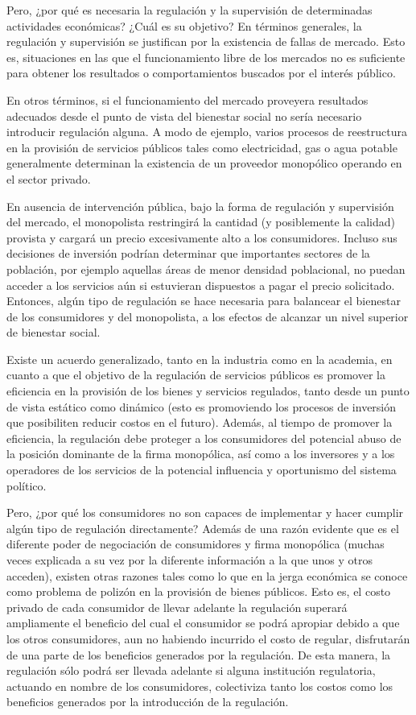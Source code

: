 \documentclass[
  12pt,
  spanish,
]{book}
\begin{document}
Pero, ¿por qué es necesaria la regulación y la supervisión de determinadas actividades económicas? ¿Cuál es su objetivo? En términos generales, la regulación y supervisión se justifican por la existencia de fallas de mercado. Esto es, situaciones en las que el funcionamiento libre de los mercados no es suficiente para obtener los resultados o comportamientos buscados por el interés público.

En otros términos, si el funcionamiento del mercado proveyera resultados adecuados desde el punto de vista del bienestar social no sería necesario introducir regulación alguna. A modo de ejemplo, varios procesos de reestructura en la provisión de servicios públicos tales como electricidad, gas o agua potable generalmente determinan la existencia de un proveedor monopólico operando en el sector privado.

En ausencia de intervención pública, bajo la forma de regulación y supervisión del mercado, el monopolista restringirá la cantidad (y posiblemente la calidad) provista y cargará un precio excesivamente alto a los consumidores. Incluso sus decisiones de inversión podrían determinar que importantes sectores de la población, por ejemplo aquellas áreas de menor densidad poblacional, no puedan acceder a los servicios aún si estuvieran dispuestos a pagar el precio solicitado. Entonces, algún tipo de regulación se hace necesaria para balancear el bienestar de los consumidores y del monopolista, a los efectos de alcanzar un nivel superior de bienestar social.

Existe un acuerdo generalizado, tanto en la industria como en la academia, en cuanto a que el objetivo de la regulación de servicios públicos es promover la eficiencia en la provisión de los bienes y servicios regulados, tanto desde un punto de vista estático como dinámico (esto es promoviendo los procesos de inversión que posibiliten reducir costos en el futuro). Además, al tiempo de promover la eficiencia, la regulación debe proteger a los consumidores del potencial abuso de la posición dominante de la firma monopólica, así como a los inversores y a los operadores de los servicios de la potencial influencia y oportunismo del sistema político.

Pero, ¿por qué los consumidores no son capaces de implementar y hacer cumplir algún tipo de regulación directamente? Además de una razón evidente que es el diferente poder de negociación de consumidores y firma monopólica (muchas veces explicada a su vez por la diferente información a la que unos y otros acceden), existen otras razones tales como lo que en la jerga económica se conoce como problema de polizón en la provisión de bienes públicos. Esto es, el costo privado de cada consumidor de llevar adelante la regulación superará ampliamente el beneficio del cual el consumidor se podrá apropiar debido a que los otros consumidores, aun no habiendo incurrido el costo de regular, disfrutarán de una parte de los beneficios generados por la regulación. De esta manera, la regulación sólo podrá ser llevada adelante si alguna institución regulatoria, actuando en nombre de los consumidores, colectiviza tanto los costos como los beneficios generados por la introducción de la regulación.
\end{document}

